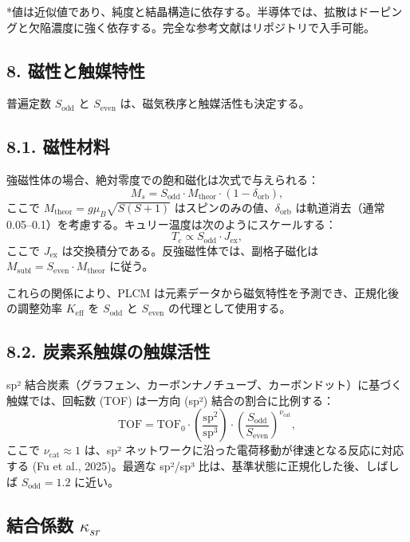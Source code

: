 \documentclass[11pt,a4paper]{article}
\theoremstyle{remark}
\begin{document}
	*値は近似値であり、純度と結晶構造に依存する。半導体では、拡散はドーピングと欠陥濃度に強く依存する。完全な参考文献はリポジトリで入手可能。
	
	
	\subsection*{8. 磁性と触媒特性}
	
	普遍定数 \(S_{\text{odd}}\) と \(S_{\text{even}}\) は、磁気秩序と触媒活性も決定する。
	
	\subsection*{8.1. 磁性材料}
	強磁性体の場合、絶対零度での飽和磁化は次式で与えられる：
	\[
	M_s = S_{\text{odd}} \cdot M_{\text{theor}} \cdot (1 - \delta_{\text{orb}}),
	\]
	ここで \(M_{\text{theor}} = g \mu_B \sqrt{S(S+1)}\) はスピンのみの値、\(\delta_{\text{orb}}\) は軌道消去（通常 0.05–0.1）を考慮する。キュリー温度は次のようにスケールする：
	\[
	T_c \propto S_{\text{odd}} \cdot J_{\text{ex}},
	\]
	ここで \(J_{\text{ex}}\) は交換積分である。反強磁性体では、副格子磁化は \(M_{\text{subl}} = S_{\text{even}} \cdot M_{\text{theor}}\) に従う。
	
	これらの関係により、PLCM は元素データから磁気特性を予測でき、正規化後の調整効率 \(K_{\text{eff}}\) を \(S_{\text{odd}}\) と \(S_{\text{even}}\) の代理として使用する。
	
	\subsection*{8.2. 炭素系触媒の触媒活性}
	sp² 結合炭素（グラフェン、カーボンナノチューブ、カーボンドット）に基づく触媒では、回転数 (TOF) は一方向 (sp²) 結合の割合に比例する：
	\[
	\text{TOF} = \text{TOF}_0 \cdot \left( \frac{\text{sp}^2}{\text{sp}^3} \right) \cdot \left( \frac{S_{\text{odd}}}{S_{\text{even}}} \right)^{\nu_{\text{cat}}},
	\]
	ここで \(\nu_{\text{cat}} \approx 1\) は、sp² ネットワークに沿った電荷移動が律速となる反応に対応する (Fu et al., 2025)。最適な sp²/sp³ 比は、基準状態に正規化した後、しばしば \(S_{\text{odd}} = 1.2\) に近い。
	
	\subsection{結合係数 \(\kappa_{sr}\)}
	
\end{document}
